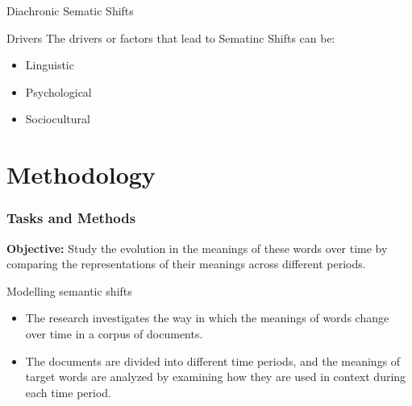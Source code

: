 \documentclass[
    11pt, %
    aspectratio=169, %
]{beamer}
\begin{document}
\begin{frame}{Diachronic Sematic Shifts}
    \begin{block}{Drivers}
        The drivers or factors that lead to Sematinc Shifts can be:
        \begin{itemize}
            \item Linguistic
            \item Psychological
            \item Sociocultural
        \end{itemize}
    \end{block}
    
\end{frame}

\section{Methodology}
\begin{frame}
    \frametitle{Tasks and Methods}

    \textbf{Objective:}
      Study the evolution in the meanings of these words over time by comparing the representations of their meanings across different periods.
     \begin{block}{Modelling semantic shifts} 
         \begin{itemize}
             \item The research investigates the way in which the meanings of words change over time in a corpus of documents.
             \item The documents are divided into different time periods, and the meanings of target words are analyzed by examining how they are used in context during each time period.
         \end{itemize}
     \end{block}
      
    
\end{frame}
\end{document}
